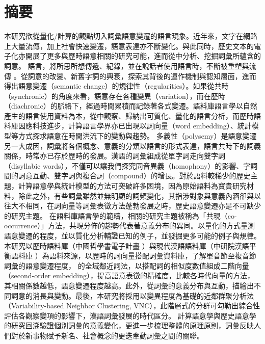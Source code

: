 

\chapter*{摘要}
本研究欲從量化/計算的觀點切入詞彙語意變遷的語言現象。近年來，文字在網路上大量流傳，加上社會快速變遷，語意表達亦不斷變化。與此同時，歷史文本的電子化亦開展了更多與歷時語意相關的研究可能，進而從中分析、挖掘詞彙所蘊含的詞意。 語言，將所思所想傳遞、紀錄，並在說話者使用語言時，不斷被重塑與流傳 \parencite[61]{blank1999new}。從詞意的改變、新舊字詞的興衰，探索其背後的運作機制與認知層面，進而得出語意變遷（semantic change）的規律性（regularities）\parencite[63]{blank1999new}。如果從共時（synchronic）的角度來看，語意存在各種變異（variation），而在歷時（diachronic）的脈絡下，經過時間累積而記錄著各式變遷。語料庫語言學以自然產生的語言使用資料為本，從中觀察、歸納出可質化、量化的語言分析，而歷時語料庫因應科技進步，計算語言學界亦已出現以詞向量（word embedding）、統計模型等方式探求語意在時間洪流下的變動與趨勢。 多義性（polysemy）是語意變遷另一大成因，詞彙將各個概念、意義的分類以語言的形式表達，語言共時下的詞義關係，時常亦已存於歷時的發展。漢語的詞彙組成從單字詞走向雙字詞（disyllabic words），不僅可以讓我們探究同音異義（homophony）的影響、字詞間的詞意互動、雙字詞與複合詞（compound）的增長。對於語料較稀少的歷史主題，計算語意學與統計模型的方法可突破許多困境，因為原始語料為寶貴研究材料，除此之外，有些詞彙雖然並無明顯的詞頻變化，其指涉對象與意義內涵卻與以往大不相同，在詞向量等詞彙表徵方法蓬勃發展之時，歷史語意變遷亦是不可缺少的研究主題。 在語料庫語言學的範疇，相關的研究主題被稱為「共現（co-occurrence）」方法，共現分佈的趨勢代表著意義分布的異同。以量化的方式量測語意變遷的程度，並以質化分析輔證已知的例子，並發掘更多可能的例子與規律。本研究以歷時語料庫（中國哲學書電子計畫 \parencite{sturgeon2019ctext}）與現代漢語語料庫（中研院漢語平衡語料庫 \parencite{chen1996sinica}）為語料來源，以歷時的詞向量搭配詞彙資料庫，了解單音節至複音節詞彙的語意變遷程度，\textcite{hamilton2016cultural} 的全域鄰近詞法，以搭配詞的相似度數值組成二階向量（second-order embedding），提高語意表徵的精確度，比較各時代向量的方法，其相關係數越低，語意變遷程度越高。此外，從詞彙的意義分布與互動，描繪出不同詞意的消長與變動。最後，本研究將採用以變異程度為基礎的近鄰群聚分析法（Variability-based Neighbor Clustering, VNC）\parencite{gries2012variability}，此階層式的分群可勾勒出綜合性評估各觀察變項的影響下，漢語詞彙發展的時代區分。 計算語意學與歷史語意學的研究回溯驗證個別詞彙的意義變化，更進一步梳理整體的原理原則，詞彙反映人們對於新事物賦予新名、社會概念的更迭牽動詞彙之間的關聯。

